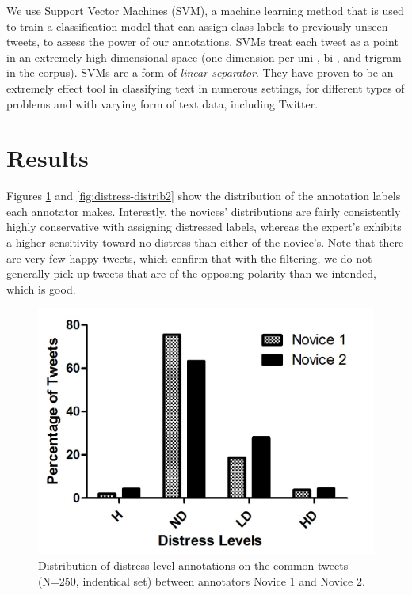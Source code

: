 \documentclass[11pt]{article}
\begin{document}
We use Support Vector Machines (SVM), a machine learning method that is used to train a classification model that can assign class labels to previously unseen tweets, to assess the power of our annotations. SVMs treat each tweet as a point in an extremely high dimensional space (one dimension per uni-, bi-, and trigram in the corpus). SVMs are a form of \emph{linear separator}. They have proven to be an extremely effect tool in classifying text in numerous settings, for different types of problems and with varying form of text data, including Twitter. 


\section{Results}

Figures \ref{fig:distress-distrib1} and \ref{fig:distress-distrib2} show the distribution of the annotation labels each annotator makes. Interestly, the novices' distributions are fairly consistently highly conservative with assigning distressed labels, whereas the expert's exhibits a higher sensitivity toward no distress than either of the novice's.  Note that there are very few happy tweets, which confirm that with the filtering, we do not generally pick up tweets that are of the opposing polarity than we intended, which is good.


\begin{figure}
\centering
\includegraphics[scale=0.65]{ChrisCissi4cat.jpg}
\caption{Distribution of distress level annotations on the common tweets (N=250, indentical set) between annotators Novice 1 and Novice 2.}
\label{fig:distress-distrib1}
\end{figure}
\end{document}
